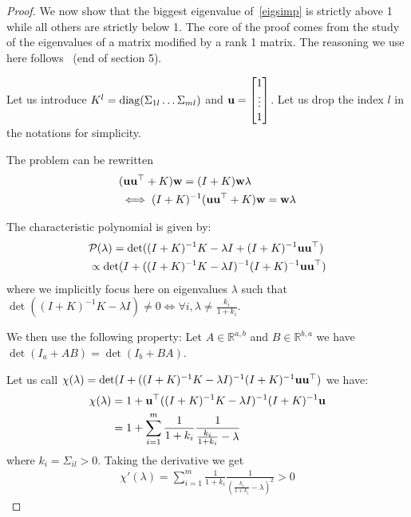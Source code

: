 \documentclass{report}
\begin{document}
{\begin{proof}
We now show that the biggest eigenvalue of~\eqref{eigsimp} is strictly above 1 while all
others are strictly below 1. The core of the proof comes from the study of the eigenvalues of a matrix modified by a rank 1 matrix. The reasoning we use here follows~\cite{golub1973some} (end of section 5).

Let us introduce 
$K^l = {\rm diag}(\Sigma_{1l} \dots \Sigma_{ml})$ and $\mathbf{u} = \begin{bmatrix} 1 \\ \vdots \\ 1 \end{bmatrix}$.
Let us drop the index $l$ in the notations for simplicity.

The problem can be rewritten
\begin{align}
  &(\mathbf{u} \mathbf{u}^{\top} + K) \mathbf{w} =  (I + K) \mathbf{w} \lambda \\
  & \iff (I + K)^{-1}(\mathbf{u} \mathbf{u}^{\top} + K) \mathbf{w} =   \mathbf{w} \lambda
\end{align}

The characteristic polynomial is given by:
\begin{align}
  &\mathcal{P}(\lambda) = \det( (I + K)^{-1} K - \lambda I + (I + K)^{-1} \mathbf{u} \mathbf{u}^{\top}) \label{carpol} \\
  &\propto \det( I + ((I + K)^{-1} K - \lambda I)^{-1}(I + K)^{-1} \mathbf{u} \mathbf{u}^{\top})
\end{align}
where we implicitly focus here on eigenvalues $\lambda$ such that $\det((I + K)^{-1} K - \lambda I) \neq 0 \iff \forall i, \lambda \neq \frac{k_i}{1 + k_i}$.

We then use the following property:
Let $A \in \mathbb{R}^{a, b}$ and $B \in \mathbb{R}^{b, a}$ we have
$\det(I_a + AB) = \det(I_b + BA)$.

Let us call $\chi(\lambda) = \det( I + ((I + K)^{-1} K - \lambda I)^{-1}(I + K)^{-1} \mathbf{u} \mathbf{u}^{\top})$ we have:
\begin{align}
\chi(\lambda)
  &= 1 + \mathbf{u}^{\top}((I + K)^{-1} K - \lambda I)^{-1}(I + K)^{-1} \mathbf{u} \\
  &= 1  + \sum_{i=1}^m \frac1{1 + k_i} \frac1{ \frac{k_i}{1 + k_i} - \lambda}
\end{align}
where $k_i = \Sigma_{il} > 0$.
Taking the derivative we get 
\begin{align}
\chi'(\lambda) = \sum_{i=1}^m \frac1{1 + k_i} \frac1{ (\frac{k_i}{1 + k_i} - \lambda)^2} > 0
\end{align}


\end{proof}}
\end{document}
